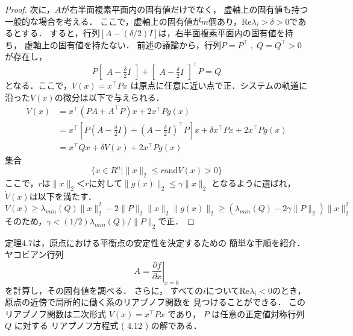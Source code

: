 \documentclass{jsarticle}
\begin{document}
\begin{proof}
  次に，$A$が右半面複素平面内の固有値だけでなく，
  虚軸上の固有値も持つ一般的な場合を考える．
  ここで，虚軸上の固有値が$m$個あり，$\text{Re}\lambda_i > \delta > 0$であるとする．
  すると，行列$[A - (\delta /2)I]$は，右半面複素平面内の固有値を持ち，
  虚軸上の固有値を持たない．
  前述の議論から，行列$P = P^\top\;,\;Q = Q^\top > 0$が存在し，
  \begin{equation*}
    P\begin{bmatrix}
      A-\frac{\delta}{2}I
    \end{bmatrix}+\begin{bmatrix}
      A - \frac{\delta}{2}I
    \end{bmatrix}^\top P = Q
  \end{equation*}
となる．ここで，$V(x) = x^\top Px$
は原点に任意に近い点で正．システムの軌道に沿った$V(x)$の微分は以下で与えられる．
\begin{align*}
  \dot V(x) & = x^\top (PA + A^\top P)x + 2x^\top Pg(x)\\
  & = x^\top \left[
    P(A-\frac{\delta}{2}I) + (A-\frac{\delta}{2}I)^\top P
  \right]x+\delta x^\top Px + 2x^\top Pg(x)\\
  & = x^\top Q x + \delta V(x) + 2x^\top P g(x)
\end{align*}
集合
\begin{equation*}
  \{x\in R^n \mid \|x\|_2 \leq r \text{and} V(x)>0\}
\end{equation*}
ここで，$r$は$\|x\|_2＜r$に対して$\|g(x)\|_2\leq \gamma \|x\|_2$
となるように選ばれ，$\dot V(x)$は以下を満たす．
\begin{equation*}
  \dot V(x) \geq \lambda_{min}(Q)\|x\|^2_2 - 2\|P\|_2\|x\|_2\|g(x)\|_2\geq 
  (\lambda_{min}(Q)-2\gamma\|P\|_2)\|x\|_2^2
\end{equation*}
そのため，$\gamma < (1/2)\lambda_{min}(Q)/\|P\|_2$で正．

\end{proof}

定理4.7は，原点における平衡点の安定性を決定するための
簡単な手順を紹介．
ヤコビアン行列
\begin{equation*}
  A = \left.\frac{\partial f}{\partial x}\right|_{x=0}
\end{equation*}
を計算し，その固有値を調べる．
さらに，
すべての$i$について$\text{Re}\lambda_i < 0$のとき，
原点の近傍で局所的に働く系のリアプノフ関数を
見つけることができる．
このリアプノフ関数は二次形式 $V ( x ) = x^\top Px$ 
であり， $P$ は任意の正定値対称行列 $Q$ に対する
リアプノフ方程式 ( 4.12 ) の解である．
\end{document}
